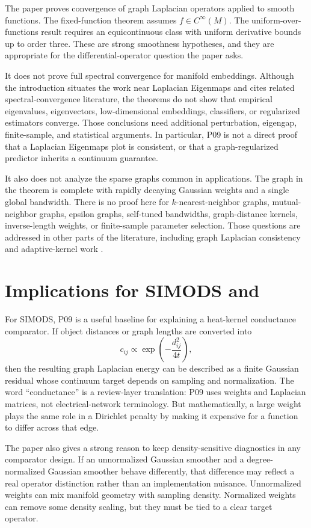 \documentclass[11pt]{article}
\begin{document}
The paper proves convergence of graph Laplacian operators applied to smooth
functions. The fixed-function theorem assumes \(f\in C^\infty(M)\). The
uniform-over-functions result requires an equicontinuous class with uniform
derivative bounds up to order three. These are strong smoothness hypotheses,
and they are appropriate for the differential-operator question the paper
asks.

It does not prove full spectral convergence for manifold embeddings. Although
the introduction situates the work near Laplacian Eigenmaps and cites related
spectral-convergence literature, the theorems do not show that empirical
eigenvalues, eigenvectors, low-dimensional embeddings, classifiers, or
regularized estimators converge. Those conclusions need additional
perturbation, eigengap, finite-sample, and statistical arguments. In particular,
P09 is not a direct proof that a Laplacian Eigenmaps plot is consistent, or
that a graph-regularized predictor inherits a continuum guarantee.

It also does not analyze the sparse graphs common in applications. The graph
in the theorem is complete with rapidly decaying Gaussian weights and a single
global bandwidth. There is no proof here for \(k\)-nearest-neighbor graphs,
mutual-neighbor graphs, epsilon graphs, self-tuned bandwidths, graph-distance
kernels, inverse-length weights, or finite-sample parameter selection. Those
questions are addressed in other parts of the literature, including graph
Laplacian consistency and adaptive-kernel work \citep{hein2007graph,cheng2022knn}.

\section{Implications for SIMODS and }

For SIMODS, P09 is a useful baseline for explaining a heat-kernel conductance
comparator. If object distances or graph lengths are converted into
\[
  c_{ij}\propto \exp\!\left(-\frac{d_{ij}^2}{4t}\right),
\]
then the resulting graph Laplacian energy can be described as a finite
Gaussian residual whose continuum target depends on sampling and
normalization. The word ``conductance'' is a review-layer translation: P09
uses weights and Laplacian matrices, not electrical-network terminology. But
mathematically, a large weight plays the same role in a Dirichlet penalty by
making it expensive for a function to differ across that edge.

The paper also gives a strong reason to keep density-sensitive diagnostics in
any comparator design. If an unnormalized Gaussian smoother and a
degree-normalized Gaussian smoother behave differently, that difference may
reflect a real operator distinction rather than an implementation nuisance.
Unnormalized weights can mix manifold geometry with sampling density.
Normalized weights can remove some density scaling, but they must be tied to a
clear target operator.
\end{document}
